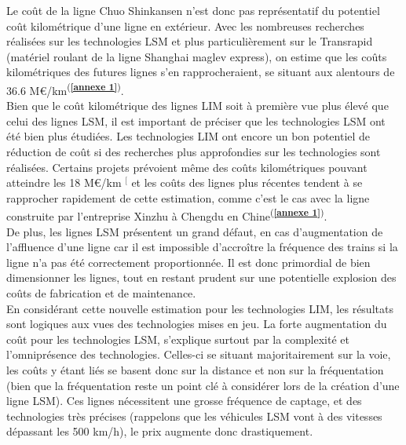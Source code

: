 \documentclass[12pt, a4paper, onecolumn]{article}
\makeatletter
\renewcommand{\tab}{\tabto{15px}}
\newcommand{\csvdel}{}
\newcommand{\bettercite}[1][,]{%
  \renewcommand{\csvdel}{\renewcommand{\csvdel}{}}%
  \csname\endcsname$^[$\checknextarg}
\newcommand{\checknextarg}{\@ifnextchar\bgroup{\gobblenext}{}}%
\newcommand{\gobblenext}[1]{\csvdel\textcolor{blue}{\textbf{\cite{#1}}}\@ifnextchar\bgroup{$^,$\gobblenext}{$^]$}}%
\newcommand{\cfannexe}[1]{\textsuperscript{(\textcolor{blue}{\textbf{\ref{annexe #1}}})}}
\makeatother
\begin{document}
Le coût de la ligne Chuo Shinkansen n’est donc pas représentatif du potentiel coût kilométrique d’une ligne en extérieur.
Avec les nombreuses recherches réalisées sur les technologies LSM et plus particulièrement sur le Transrapid (matériel roulant de la ligne Shanghai maglev express), on estime que les coûts kilométriques des futures lignes s'en rapprocheraient, se situant aux alentours de 36.6 M\euro/km\cfannexe{1}. \\
\linebreak
\tab Bien que le coût kilométrique des lignes LIM soit à première vue plus élevé que celui des lignes LSM, il est important de préciser que les technologies LSM ont été bien plus étudiées.
Les technologies LIM ont encore un bon potentiel de réduction de coût si des recherches plus approfondies sur les technologies sont réalisées.
Certains projets prévoient même des coûts kilométriques pouvant atteindre les 18 M\euro/km\bettercite{coloradomaglev} et les coûts des lignes plus récentes tendent à se rapprocher rapidement de cette estimation, comme c'est le cas avec la ligne construite par l'entreprise Xinzhu à Chengdu en Chine\cfannexe{1}. \\
\tab De plus, les lignes LSM présentent un grand défaut, en cas d'augmentation de l’affluence d’une ligne car il est impossible d'accroître la fréquence des trains si la ligne n’a pas été correctement proportionnée.
Il est donc primordial de bien dimensionner les lignes, tout en restant prudent sur une potentielle explosion des coûts de fabrication et de maintenance. \\



\pagebreak %
\tab En considérant cette nouvelle estimation pour les technologies LIM, les résultats sont logiques aux vues des technologies mises en jeu.
La forte augmentation du coût pour les technologies LSM, s’explique surtout par la complexité et l’omniprésence des technologies.
Celles-ci se situant majoritairement sur la voie, les coûts y étant liés se basent donc sur la distance et non sur la fréquentation (bien que la fréquentation reste un point clé à considérer lors de la création d’une ligne LSM).
Ces lignes nécessitent une grosse fréquence de captage, et des technologies très précises (rappelons que les véhicules LSM vont à des vitesses dépassant les 500 km/h), le prix augmente donc drastiquement. \\
\end{document}
